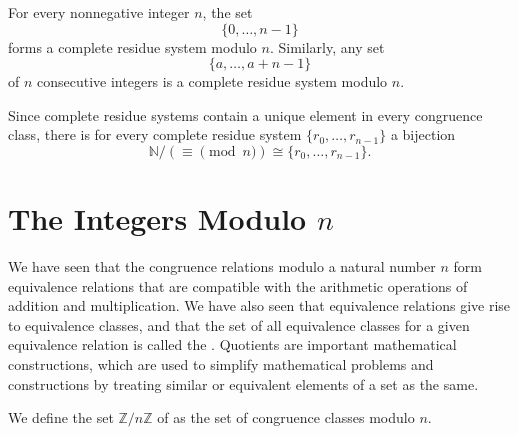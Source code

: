 \begin{example}
  For every nonnegative integer $n$, the set
  \begin{equation*}
    \{0,\ldots,n-1\}
  \end{equation*}
  forms a complete residue system modulo $n$. Similarly, any set
  \begin{equation*}
    \{a,\ldots,a+n-1\}
  \end{equation*}
  of $n$ consecutive integers is a complete residue system modulo $n$.
\end{example}

\begin{remark}
  Since complete residue systems contain a unique element in every congruence class, there is for every complete residue system $\{r_0,\ldots,r_{n-1}\}$ a bijection
  \begin{equation*}
    \mathbb{N}/{({\equiv}\pmod{n})} \cong \{r_0,\ldots,r_{n-1}\}.
  \end{equation*}
\end{remark}

\section{The Integers Modulo \texorpdfstring{$n$}{n}}

We have seen that the congruence relations modulo a natural number $n$ form equivalence relations that are compatible with the arithmetic operations of addition and multiplication. We have also seen that equivalence relations give rise to equivalence classes, and that the set of all equivalence classes for a given equivalence relation is called the . Quotients are important mathematical constructions, which are used to simplify mathematical problems and constructions by treating similar or equivalent elements of a set as the same.

\begin{definition}
  We define the set $\mathbb{Z}/n\mathbb{Z}$ of  as the set of congruence classes modulo $n$.
\end{definition}

